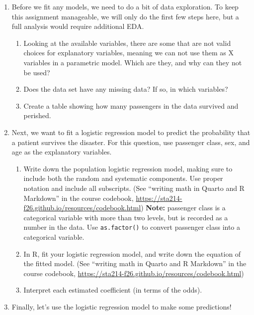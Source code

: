 \documentclass[11pt]{article}
\begin{document}
\begin{enumerate}
\item Before we fit any models, we need to do a bit of data exploration. To keep this assignment manageable, we will only do the first few steps here, but a full analysis would require additional EDA.

\begin{enumerate}
\item Looking at the available variables, there are some that are not valid choices for explanatory variables, meaning we can not use them as X variables in a parametric model. Which are they, and why can they not be used?

\item Does the data set have any missing data? If so, in which variables?

\item Create a table showing how many passengers in the data survived and perished.
\end{enumerate}

\item Next, we want to fit a logistic regression model to predict the probability that a patient survives the disaster. For this question, use passenger class, sex, and age as the explanatory variables.

\begin{enumerate}
\item Write down the population logistic regression model, making sure to include both the random and systematic components. Use proper notation and include all subscripts. (See ``writing math in Quarto and R Markdown'' in the course codebook, \url{https://sta214-f26.github.io/resources/codebook.html}) \textbf{Note:} passenger class is a categorical variable with more than two levels, but is recorded as a number in the data. Use \texttt{as.factor()} to convert passenger class into a categorical variable.

\item In R, fit your logistic regression model, and write down the equation of the fitted model. (See ``writing math in Quarto and R Markdown'' in the course codebook, \url{https://sta214-f26.github.io/resources/codebook.html})

\item Interpret each estimated coefficient (in terms of the odds).
\end{enumerate}

\item Finally, let's use the logistic regression model to make some predictions!


\end{enumerate}
\end{document}
